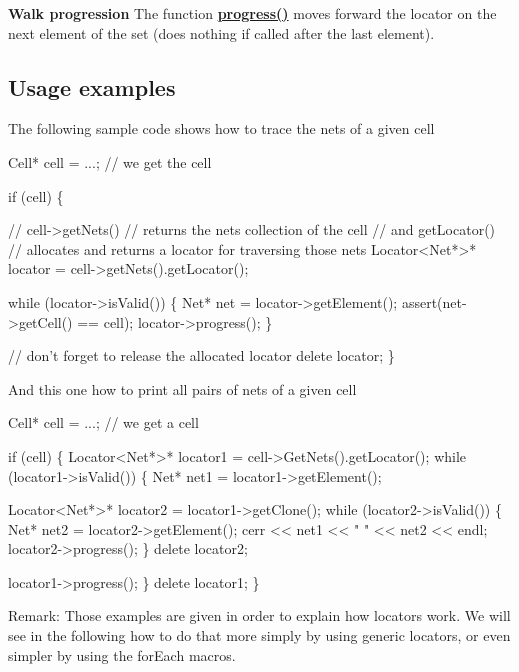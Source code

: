 {\bfseries Walk progression} The function {\bfseries \hyperlink{classHurricane_1_1Locator_ad8d72c1625a343a50520792c96fa1ca1}{progress()}} moves forward the locator on the next element of the set (does nothing if called after the last element).\hypertarget{classHurricane_1_1Locator_secLocatorUsageExamples}{}\subsection{Usage examples}\label{classHurricane_1_1Locator_secLocatorUsageExamples}
The following sample code shows how to trace the nets of a given cell 
\begin{DoxyCode}
Cell* cell = ...; \textcolor{comment}{// we get the cell}
 
\textcolor{keywordflow}{if} (cell) \{
 
   \textcolor{comment}{// cell->getNets()}
   \textcolor{comment}{//    returns the nets collection of the cell}
   \textcolor{comment}{// and getLocator()}
   \textcolor{comment}{//    allocates and returns a locator for traversing those nets}
   Locator<Net*>* locator = cell->getNets().getLocator();
 
   \textcolor{keywordflow}{while} (locator->isValid()) \{
      Net* net = locator->getElement();
      assert(net->getCell() == cell);
      locator->progress();
   \}
 
   \textcolor{comment}{// don't forget to release the allocated locator}
   \textcolor{keyword}{delete} locator;
\}
\end{DoxyCode}
 And this one how to print all pairs of nets of a given cell 
\begin{DoxyCode}
Cell* cell = ...; \textcolor{comment}{// we get a cell}
 
\textcolor{keywordflow}{if} (cell) \{
   Locator<Net*>* locator1 = cell->GetNets().getLocator();
   \textcolor{keywordflow}{while} (locator1->isValid()) \{
      Net* net1 = locator1->getElement();
 
      Locator<Net*>* locator2 = locator1->getClone();
      \textcolor{keywordflow}{while} (locator2->isValid()) \{
         Net* net2 = locator2->getElement();
         cerr << net1 << \textcolor{stringliteral}{" "} << net2 << endl;
         locator2->progress();
      \}
      \textcolor{keyword}{delete} locator2;
 
      locator1->progress();
   \}
   \textcolor{keyword}{delete} locator1;
\}
\end{DoxyCode}
 \begin{DoxyParagraph}{Remark\+:}
Those examples are given in order to explain how locators work. We will see in the following how to do that more simply by using generic locators, or even simpler by using the for\+Each macros. 
\end{DoxyParagraph}


